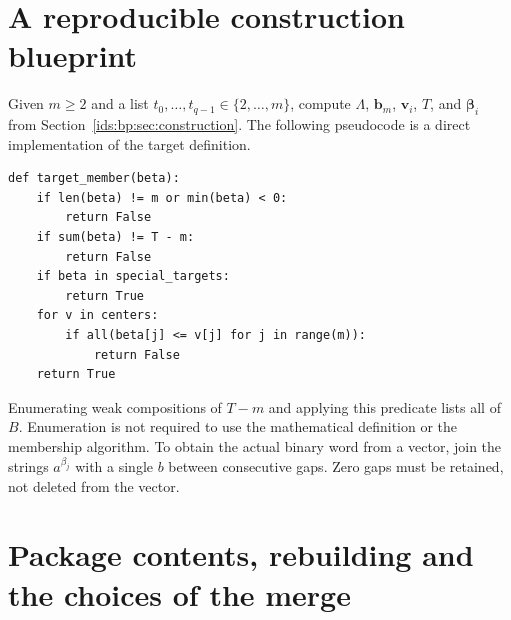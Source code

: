 \documentclass[11pt,letterpaper]{article}
\theoremstyle{definition}\newtheorem{definition}[theorem]{Definition}
\theoremstyle{remark}\newtheorem{remark}[theorem]{Remark}
\theoremstyle{definition}\newtheorem{question}[theorem]{Question}
\begin{document}
\section{A reproducible construction blueprint}
\label{ids:bp:sec:blueprint}
Given $m\geq2$ and a list $t_0,\ldots,t_{q-1}\in\{2,\ldots,m\}$,
compute $\Lambda$, $\mathbf b_m$, $\mathbf v_i$, $T$, and
$\boldsymbol\beta_i$ from Section~\ref{ids:bp:sec:construction}. The
following pseudocode is a direct implementation of the target definition.
\begin{lstlisting}
def target_member(beta):
    if len(beta) != m or min(beta) < 0:
        return False
    if sum(beta) != T - m:
        return False
    if beta in special_targets:
        return True
    for v in centers:
        if all(beta[j] <= v[j] for j in range(m)):
            return False
    return True
\end{lstlisting}
Enumerating weak compositions of $T-m$ and applying this predicate lists all
of $B$. Enumeration is not required to use the mathematical definition or
the membership algorithm. To obtain the actual binary word from a vector,
join the strings $a^{\beta_j}$ with a single $b$ between consecutive gaps.
Zero gaps must be retained, not deleted from the vector.

\section{Package contents, rebuilding and the choices of the merge}
\label{ids:bp:sec:package}
\end{document}
